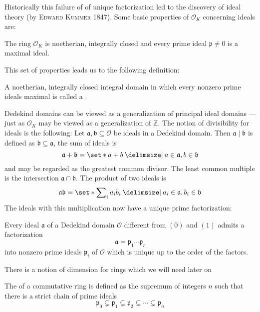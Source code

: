 Historically this failure of of unique factorization led to the discovery of ideal theory (by \textsc{Edward Kummer} 1847).
Some basic properties of $\mathcal{O}_K$ concerning ideals are:

\begin{theorem}[{name={\cite[Thm.~3.1]{neukirch}}}]
	The ring $\mathcal{O}_K$ is noetherian, integrally closed and every prime ideal $\mathfrak{p} \neq 0$ is a maximal ideal.
\end{theorem}

This set of properties leads us to the following definition:

\begin{definition}[{name=[Dedekind domain]}]
	A noetherian, integrally closed integral domain in which every nonzero prime ideals maximal is called a .
\end{definition}

Dedekind domains can be viewed as a generalization of principal ideal domains --- just as $\mathcal{O}_K$ may be viewed as a generalization of $\mathbb{Z}$.
The notion of divisibility for ideals is the following: Let $\mathfrak{a}, \mathfrak{b} \subseteq \mathcal{O}$ be ideals in a Dedekind domain.
Then $\mathfrak{a} \mid \mathfrak{b}$ is defined as $\mathfrak{b} \subseteq \mathfrak{a}$, the sum of ideals is
\[
	\mathfrak{a} + \mathfrak{b} = \set*{a + b \given a \in \mathfrak{a}, b \in \mathfrak{b}}
\]
and may be regarded as the greatest common divisor.
The least common multiple is the intersection $\mathfrak{a} \cap \mathfrak{b}$.
The product of two ideals is
\[
	\mathfrak{a} \mathfrak{b} = \set*{\sum\nolimits_i a_i b_i \given a_i \in \mathfrak{a}, b_i \in \mathfrak{b}}
\]
The ideals with this multiplication now have a unique prime factorization:

\begin{theorem}[{name={\cite[Thm.~3.3]{neukirch}}}]
	Every ideal $\mathfrak{a}$ of a Dedekind domain $\mathcal{O}$ different from $(0)$ and $(1)$ admits a factorization
	\[
		\mathfrak{a} = \mathfrak{p}_1 \cdots \mathfrak{p}_r
	\]
	into nonzero prime ideals $\mathfrak{p}_i$ of $\mathcal{O}$ which is unique up to the order of the factors.
\end{theorem}

There is a notion of dimension for rings which we will need later on
\begin{definition}[{name=[Krull dimension]}]
	The  of a commutative ring is defined as the supremum of integers $n$ such that there is a strict chain of prime ideals
	\[
		\mathfrak{p}_0 \subsetneq \mathfrak{p}_1 \subsetneq \mathfrak{p}_2 \subsetneq \cdots \subsetneq \mathfrak{p}_n
	\]
\end{definition}

